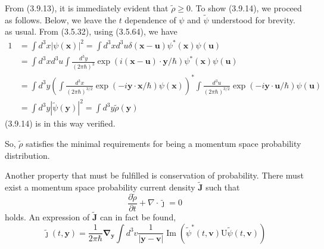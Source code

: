 \documentclass{article}
\begin{document}
From (3.9.13), it is immediately evident that $\tilde{\rho} \geq 0$. To show (3.9.14), we proceed as follows. Below, we leave the $t$ dependence of $\psi$ and $\tilde{\psi}$ understood for brevity. as usual. From (3.5.32), using (3.5.64), we have
$$
\begin{align*}
1 & =\int d^{3} x|\psi(\boldsymbol{x})|^{2}=\int d^{3} x d^{3} u \delta(\boldsymbol{x}-\boldsymbol{u}) \psi^{*}(\boldsymbol{x}) \psi(\boldsymbol{u})  \tag{3.9.15}\\
& =\int d^{3} x d^{3} u \int \frac{d^{3} y}{(2 \pi \hbar)^{3}} \exp (i(\boldsymbol{x}-\boldsymbol{u}) \cdot \boldsymbol{y} / \hbar) \psi^{*}(\boldsymbol{x}) \psi(\boldsymbol{u}) \\
& =\int d^{3} y\left(\int \frac{d^{3} x}{(2 \pi \hbar)^{3 / 2}} \exp (-i \boldsymbol{y} \cdot \boldsymbol{x} / \hbar) \psi(\boldsymbol{x})\right)^{*} \int \frac{d^{3} u}{(2 \pi \hbar)^{3 / 2}} \exp (-i \boldsymbol{y} \cdot \boldsymbol{u} / \hbar) \psi(\boldsymbol{u}) \\
& =\int d^{3} y|\tilde{\psi}(\boldsymbol{y})|^{2}=\int d^{3} y \tilde{\rho}(\boldsymbol{y})
\end{align*}
$$
(3.9.14) is in this way verified.

So, $\tilde{\rho}$ satisfies the minimal requirements for being a momentum space probability distribution.

Another property that must be fulfilled is conservation of probability. There must exist a momentum space probability current density $\tilde{\boldsymbol{J}}$ such that
$$
\begin{equation*}
\frac{\partial \tilde{\rho}}{\partial t}+\nabla \cdot \tilde{\boldsymbol{\jmath}}=0 \tag{3.9.16}
\end{equation*}
$$
holds. An expression of $\tilde{\boldsymbol{J}}$ can in fact be found,
$$
\begin{equation*}
\tilde{\boldsymbol{\jmath}}(t, \boldsymbol{y})=\frac{1}{2 \pi \hbar} \boldsymbol{\nabla}_{\boldsymbol{y}} \int d^{3} v \frac{1}{|\boldsymbol{y}-\boldsymbol{v}|} \operatorname{Im}\left(\tilde{\psi}^{*}(t, \boldsymbol{v}) \mathrm{U} \tilde{\psi}(t, \boldsymbol{v})\right) \tag{3.9.17}
\end{equation*}
$$
\end{document}
